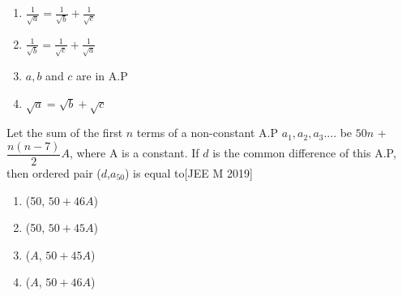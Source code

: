 {{\begin{enumerate}
  \item {$\frac{1}{\sqrt{a}}=\frac{1}{\sqrt{b}}+\frac{1}{\sqrt{c}}$} 
  \item {$\frac{1}{\sqrt{b}}=\frac{1}{\sqrt{c}}+\frac{1}{\sqrt{a}}$} 
  \item{$a,b$ and $c$ are in A.P}
  \item{${\sqrt{a}}={\sqrt{b}}+{\sqrt{c}}$}
  \end{enumerate}} 
  \item{Let the sum of the first $n$ terms of a non-constant A.P $a_{1},a_{2},a_{3}$.... be $50n$ + $\dfrac{n(n-7)}{2}A$, where A is a constant. If $d$ is the common difference of this A.P, then ordered pair ($d$,$a_{50}$) is equal to\hfill{[JEE M 2019]}} \vspace{.5em}\begin{enumerate}
		  \itemsep.5em  \item {(50, $50+46A$)} \item{(50, $50+45A$)}
  \item{($A$, $50+45A$)}
  \item{($A$, $50+46A$)}
  \end{enumerate}}

%

